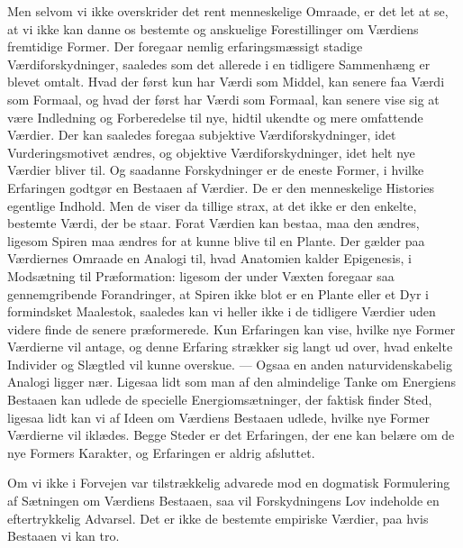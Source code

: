 \documentclass[12pt,a4paper,openany]{book}
\newcommand{\opage}[1]{\marginnote{\footnotesize\textit{[#1]}}}
\begin{document}
Men selvom vi ikke overskrider det rent menneskelige Omraade, er det let
at se, at vi ikke kan danne os bestemte og anskuelige Forestillinger om
Værdiens fremtidige Former. Der foregaar nemlig erfaringsmæssigt stadige
Værdiforskydninger, saaledes som det allerede i en tidligere Sammenhæng
er blevet omtalt. Hvad der først kun har Værdi som Middel, kan senere
faa Værdi som Formaal, og hvad der først har Værdi som Formaal, kan
senere vise sig at være Indledning og Forberedelse til nye, hidtil
ukendte og mere omfattende Værdier. Der kan saaledes foregaa subjektive
Værdiforskydninger, idet Vurderingsmotivet ændres, og objektive
Værdiforskydninger, idet helt nye Værdier bliver til. Og saadanne
Forskydninger er de eneste Former, i hvilke Erfaringen godtgør en
Bestaaen af Værdier. De er den menneskelige Histories egentlige Indhold.
Men de viser da tillige strax, at det ikke er den enkelte, bestemte
Værdi, der be%
\opage{175}staar. Forat Værdien kan bestaa, maa den ændres, ligesom
Spiren maa ændres for at kunne blive til en Plante. Der gælder paa
Værdiernes Omraade en Analogi til, hvad Anatomien kalder Epigenesis, i
Modsætning til Præformation: ligesom der under Væxten foregaar saa
gennemgribende Forandringer, at Spiren ikke blot er en Plante eller et
Dyr i formindsket Maalestok, saaledes kan vi heller ikke i de tidligere
Værdier uden videre finde de senere præformerede. Kun Erfaringen kan
vise, hvilke nye Former Værdierne vil antage, og denne Erfaring strækker
sig langt ud over, hvad enkelte Individer og Slægtled vil kunne
overskue. --- Ogsaa en anden naturvidenskabelig Analogi ligger nær.
Ligesaa lidt som man af den almindelige Tanke om Energiens Bestaaen kan
udlede de specielle Energiomsætninger, der faktisk finder Sted, ligesaa
lidt kan vi af Ideen om Værdiens Bestaaen udlede, hvilke nye Former
Værdierne vil iklædes. Begge Steder er det Erfaringen, der ene kan
belære om de nye Formers Karakter, og Erfaringen er aldrig afsluttet.

Om vi ikke i Forvejen var tilstrækkelig advarede mod en dogmatisk
Formulering af Sætningen om Værdiens Bestaaen, saa vil Forskydningens
Lov indeholde en eftertrykkelig Advarsel. Det er ikke de bestemte
empiriske Værdier, paa hvis Bestaaen vi kan tro.
\end{document}
